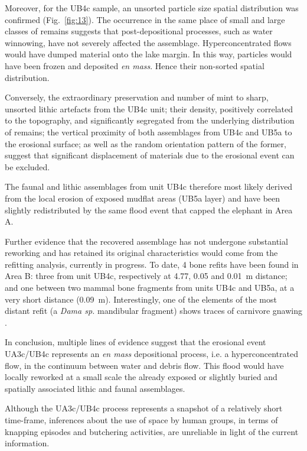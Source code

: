 \documentclass[preprint,authoryear,times]{elsarticle} %
\begin{document}
Moreover, for the UB4c sample, an unsorted particle size spatial distribution was confirmed (Fig.~\ref{fig:13}). The occurrence in the same place of small and large classes of remains suggests that post-depositional processes, such as water winnowing, have not severely affected the assemblage. Hyperconcentrated flows would have dumped material onto the lake margin. In this way, particles would have been frozen and deposited \emph{en mass}. Hence their non-sorted spatial distribution.

Conversely, the extraordinary preservation and number of mint to sharp, unsorted lithic artefacts from the UB4c unit; their density, positively correlated to the topography, and significantly segregated from the underlying distribution of remains; the vertical proximity of both assemblages from UB4c and UB5a to the erosional surface; as well as the random orientation pattern of the former, suggest that significant displacement of materials due to the erosional event can be excluded.

The faunal and lithic assemblages from unit UB4c therefore most likely derived from the local erosion of exposed mudflat areas (UB5a layer) and have been slightly redistributed by the same flood event that capped the elephant in Area A.

Further evidence that the recovered assemblage has not undergone substantial reworking and has retained its original characteristics would come from the refitting analysis, currently in progress. To date, 4 bone refits have been found in Area B: three from unit UB4c, respectively at 4.77, 0.05 and 0.01~m distance; and one between two mammal bone fragments from units UB4c and UB5a, at a very short distance (0.09~m). Interestingly, one of the elements of the most distant refit (a \emph{Dama sp.} mandibular fragment) shows traces of carnivore gnawing \citep{Konidaris}.

In conclusion, multiple lines of evidence suggest that the erosional event UA3c/UB4c represents an \emph{en mass} depositional process, i.e. a hyperconcentrated flow, in the continuum between water and debris flow. This flood would have locally reworked at a small scale the already exposed or slightly buried and spatially associated lithic and faunal assemblages.

Although the UA3c/UB4c process represents a snapshot of a relatively short time-frame, inferences about the use of space by human groups, in terms of knapping episodes and butchering activities, are unreliable in light of the current information.
\end{document}
